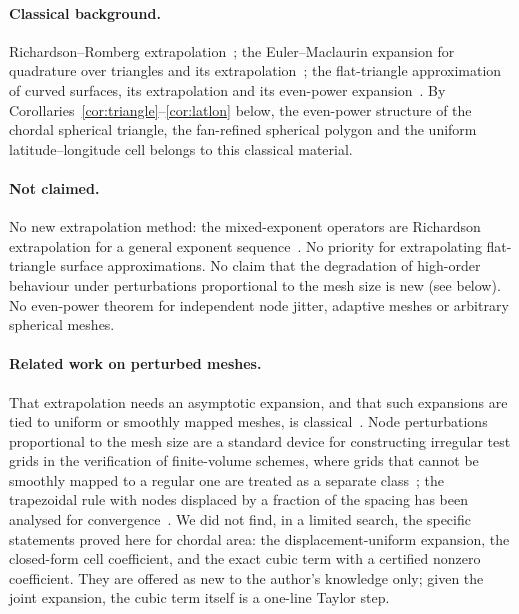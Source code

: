 \documentclass[11pt]{article}
\theoremstyle{remark}
\begin{document}
\paragraph{Classical background.}
Richardson--Romberg extrapolation~\cite{richardson,brs}; the Euler--Maclaurin expansion for
quadrature over triangles and its extrapolation~\cite{lyness78}; the flat-triangle
approximation of curved surfaces, its extrapolation and its even-power
expansion~\cite{georg91,georgtausch,verlindencools,lyness94}. By
Corollaries~\ref{cor:triangle}--\ref{cor:latlon} below, the even-power structure of the
chordal spherical triangle, the fan-refined spherical polygon and the uniform
latitude--longitude cell belongs to this classical material.

\paragraph{Not claimed.}
No new extrapolation method: the mixed-exponent operators are Richardson extrapolation for a
general exponent sequence~\cite{bulirschstoer,sidi}. No priority for extrapolating
flat-triangle surface approximations. No claim that the degradation of high-order behaviour
under perturbations proportional to the mesh size is new (see below). No even-power theorem
for independent node jitter, adaptive meshes or arbitrary spherical meshes.

\paragraph{Related work on perturbed meshes.}
That extrapolation needs an asymptotic expansion, and that such expansions are tied to
uniform or smoothly mapped meshes, is classical~\cite{marchukshaidurov,blumlinrannacher}.
Node perturbations proportional to the mesh size are a standard device for constructing
irregular test grids in the verification of finite-volume schemes, where grids that cannot be
smoothly mapped to a regular one are treated as a separate class~\cite{diskinthomas}; the
trapezoidal rule with nodes displaced by a fraction of the spacing has been analysed for
convergence~\cite{austintrefethen}. We did not find, in a limited search, the specific
statements proved here for chordal area: the displacement-uniform expansion, the closed-form
cell coefficient, and the exact cubic term with a certified nonzero coefficient. They are
offered as new to the author's knowledge only; given the joint expansion, the cubic term
itself is a one-line Taylor step.
\end{document}
